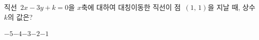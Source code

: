 직선~$2x-3y+k=0$을 $x$축에 대하여 대칭이동한 직선이 점~$(1,\,1)$을 지날 때, 상수 $k$의 값은?
\begin{choices32}{$-5$}{$-4$}{$-3$}{$-2$}{$-1$}\end{choices32}
